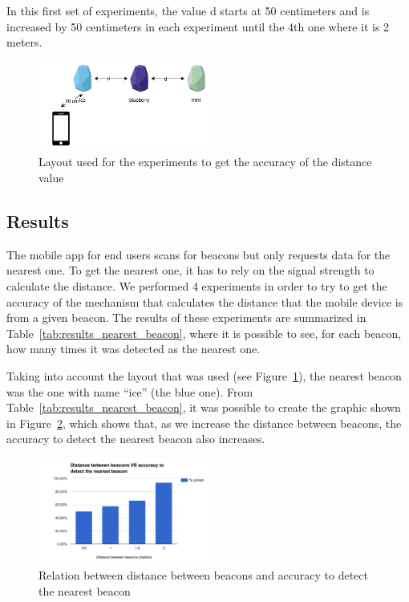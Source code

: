 In this first set of experiments, the value d starts at 50 centimeters and is increased by 50 centimeters in each experiment until the 4th one where it is 2 meters.

\begin{figure}[!ht]
  \centering
    \includegraphics[width=0.5\textwidth, keepaspectratio]{images/nearest_beacon}
    \caption[Layout for experiments of nearest beacon]{Layout used for the experiments to get the accuracy of the distance value}
    \label{fig:layout_experiments_nearest_beacon}
\end{figure}

\subsection{Results}
\label{sub:evaluation_nearest_beacon_results}
The mobile app for end users scans for beacons but only requests data for the nearest one. To get the nearest one, it has to rely on the signal strength to calculate the distance. We performed 4 experiments in order to try to get the accuracy of the mechanism that calculates the distance that the mobile device is from a given beacon.
The results of these experiments are summarized in Table~\ref{tab:results_nearest_beacon}, where it is possible to see, for each beacon, how many times it was detected as the nearest one.

Taking into account the layout that was used (see Figure~\ref{fig:layout_experiments_nearest_beacon}), the nearest beacon was the one with name ``ice'' (the blue one).
From Table~\ref{tab:results_nearest_beacon}, it was possible to create the graphic shown in Figure~\ref{fig:results_experiments_nearest_beacon}, which shows that, as we increase the distance between beacons, the accuracy to detect the nearest beacon also increases.



\begin{figure}[!ht]
  \centering
    \includegraphics[width=0.5\textwidth, keepaspectratio]{images/results_nearest_beacon}
    \caption[Distance between beacons vs Accuracy]{Relation between distance between beacons and accuracy to detect the nearest beacon}
    \label{fig:results_experiments_nearest_beacon}
\end{figure}

